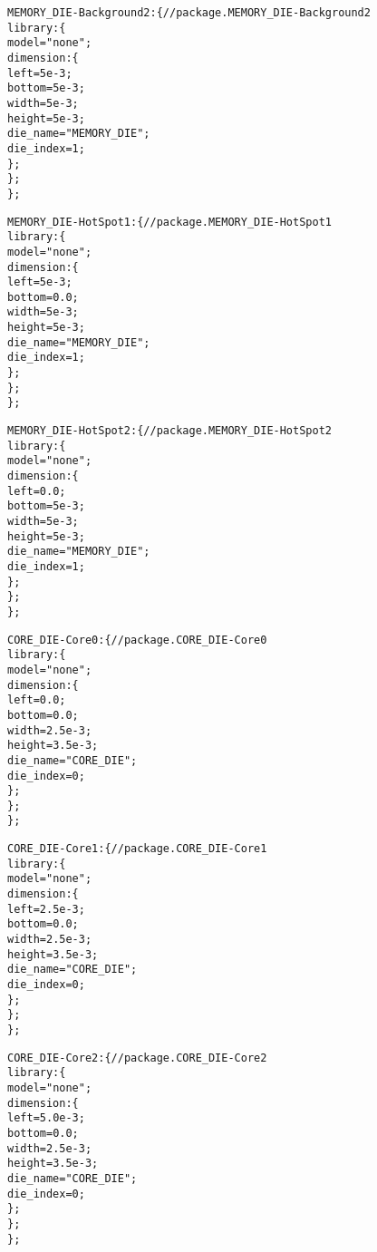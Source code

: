 {\begin{alltt}
            MEMORY\_DIE-Background2: \{ // package.MEMORY\_DIE-Background2
                library: \{
                    model = "none";
                    dimension: \{
                        left = 5e-3;
                        bottom = 5e-3;
                        width = 5e-3;
                        height = 5e-3;
                        die_name = "MEMORY_DIE";
                        die_index = 1;
                    \};
                \};
            \};
            
            MEMORY\_DIE-HotSpot1: \{ // package.MEMORY\_DIE-HotSpot1
                library: \{
                    model = "none";
                    dimension: \{
                        left = 5e-3;
                        bottom = 0.0;
                        width = 5e-3;
                        height = 5e-3;
                        die_name = "MEMORY_DIE";
                        die_index = 1;
                    \};
                \};
            \};
            
            MEMORY\_DIE-HotSpot2: \{ // package.MEMORY\_DIE-HotSpot2
                library: \{
                    model = "none";
                    dimension: \{
                        left = 0.0;
                        bottom = 5e-3;
                        width = 5e-3;
                        height = 5e-3;
                        die_name = "MEMORY_DIE";
                        die_index = 1;
                    \};
                \};
            \};
            
            CORE\_DIE-Core0: \{ // package.CORE\_DIE-Core0
                library: \{
                    model = "none";
                    dimension: \{
                        left = 0.0;
                        bottom = 0.0;
                        width = 2.5e-3;
                        height = 3.5e-3;
                        die_name = "CORE_DIE";
                        die_index = 0;
                    \};
                \};
            \};
            
            CORE\_DIE-Core1: \{ // package.CORE\_DIE-Core1
                library: \{
                    model = "none";
                    dimension: \{
                        left = 2.5e-3;
                        bottom = 0.0;
                        width = 2.5e-3;
                        height = 3.5e-3;
                        die_name = "CORE_DIE";
                        die_index = 0;
                    \};
                \};
            \};
            
            CORE\_DIE-Core2: \{ // package.CORE\_DIE-Core2
                library: \{
                    model = "none";
                    dimension: \{
                        left = 5.0e-3;
                        bottom = 0.0;
                        width = 2.5e-3;
                        height = 3.5e-3;
                        die_name = "CORE_DIE";
                        die_index = 0;
                    \};
                \};
            \};
            

\end{alltt}}
